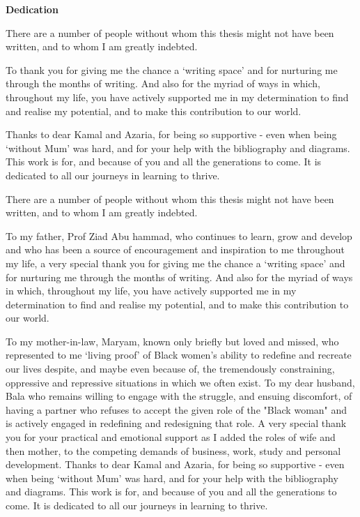  \vspace{5 cm}

   \begin{center}

 \textbf{Dedication} 
\end{center}


        \vspace{1cm}

There are a number of people without whom this thesis might not have been written,
and to whom I am greatly indebted.

To 
thank you for giving me the chance a ‘writing space’ and for nurturing me through the months of
writing. And also for the myriad of ways in which, throughout my life, you have
actively supported me in my determination to find and realise my potential, and to
make this contribution to our world.



Thanks to dear Kamal and Azaria, for being so supportive - even when being ‘without
Mum’ was hard, and for your help with the bibliography and diagrams. This work is
for, and because of you and all the generations to come. It is dedicated to all our
journeys in learning to thrive.


There are a number of people without whom this thesis might not have been written,
and to whom I am greatly indebted.

To my father, Prof Ziad Abu hammad, who continues to learn, grow and develop and who has been a
source of encouragement and inspiration to me throughout my life, a very special
thank you for giving me the chance a ‘writing space’ and for nurturing me through the months of
writing. And also for the myriad of ways in which, throughout my life, you have
actively supported me in my determination to find and realise my potential, and to
make this contribution to our world.

To my mother-in-law, Maryam, known only briefly but loved and missed, who
represented to me ‘living proof’ of Black women’s ability to redefine and recreate our
lives despite, and maybe even because of, the tremendously constraining, oppressive
and repressive situations in which we often exist.
To my dear husband, Bala who remains willing to engage with the struggle, and
ensuing discomfort, of having a partner who refuses to accept the given role of the
"Black woman" and is actively engaged in redefining and redesigning that role. A
very special thank you for your practical and emotional support as I added the roles of
wife and then mother, to the competing demands of business, work, study and
personal development.
Thanks to dear Kamal and Azaria, for being so supportive - even when being ‘without
Mum’ was hard, and for your help with the bibliography and diagrams. This work is
for, and because of you and all the generations to come. It is dedicated to all our
journeys in learning to thrive.


\hspace{0pt}
